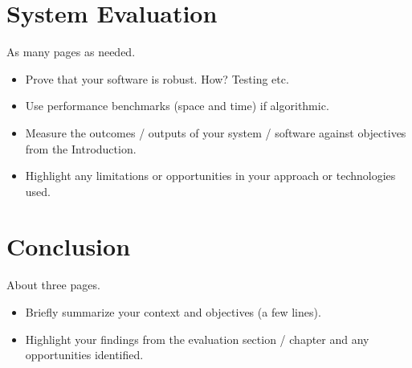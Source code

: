 \chapter{System Evaluation}
As many pages as needed.
\begin{itemize}
\item Prove that your software is robust. How? Testing etc. 
\item Use performance benchmarks (space and time) if algorithmic.
\item Measure the outcomes / outputs of your system / software against objectives from the Introduction.
\item Highlight any limitations or opportunities in your approach or technologies used.
\end{itemize}

\chapter{Conclusion}
About three pages.

\begin{itemize}
\item Briefly summarize your context and objectives (a few lines).
\item Highlight your findings from the evaluation section / chapter and any opportunities identified.
\end{itemize}

